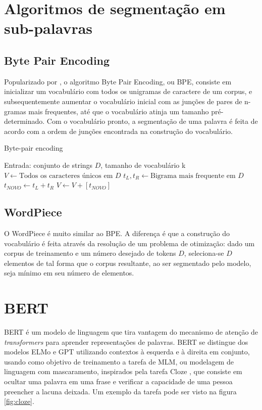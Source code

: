 \documentclass[cic,tc]{iiufrgs}
\begin{document}
\section{Algoritmos de segmentação em sub-palavras}
\subsection{Byte Pair Encoding}
Popularizado por \cite{sennrich-etal-2016-neural}, o algoritmo Byte Pair Encoding, ou BPE, consiste em inicializar um vocabulário com todos os unigramas de caractere de um corpus, e subsequentemente aumentar o vocabulário inicial com as junções de pares de n-gramas mais frequentes, até que o vocabulário atinja um tamanho pré-determinado. Com o vocabulário pronto, a segmentação de uma palavra é feita de acordo com a ordem de junções encontrada na  construção do vocabulário.

\begin{algorithm}
    \caption{Byte-pair encoding}\label{alg:bpe}
    \begin{algorithmic}[1]
    \State Entrada: conjunto de strings $D$, tamanho de vocabulário k
        \State $V\gets \text{Todos os caracteres únicos em $D$}$
            \State $t_{L}, t_{R} \gets \text{Bigrama mais frequente em $D$}$
            \State $t_{NOVO} \gets t_{L} + t_{R}$
            \State $V \gets V + [t_{NOVO}]$
            \State {}
        \EndWhile
    \EndProcedure
    \end{algorithmic}
\end{algorithm}

\subsection{WordPiece}
O WordPiece \cite{Wu2016GooglesNM} é muito similar ao BPE. A diferença é que a construção do vocabulário é feita através da resolução de um problema de otimização: dado um corpus de treinamento e um número desejado de tokens $D$, seleciona-se $D$ elementos de tal forma que o corpus resultante, ao ser segmentado pelo modelo, seja mínimo em seu número de elementos.


\section{BERT}
BERT é um modelo de linguagem que tira vantagem do mecanismo de atenção de \emph{transformers} para aprender representações de palavras. BERT se distingue dos modelos ELMo \cite{peters-etal-2018-deep} e GPT \cite{Radford2018ImprovingLU} utilizando contextos à esquerda e à direita em conjunto, usando como objetivo de treinamento a tarefa de MLM, ou modelagem de linguagem com mascaramento, inspirados pela tarefa Cloze \cite{Taylor1953ClozePA}, que consiste em ocultar uma palavra em uma frase e verificar a capacidade de uma pessoa preencher a lacuna deixada. Um exemplo da tarefa pode ser visto na figura \ref{fig:cloze}.
\end{document}
